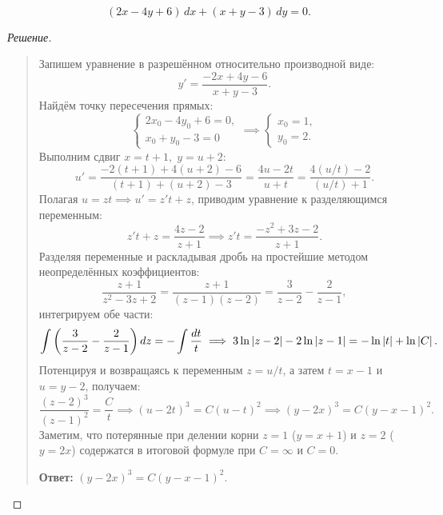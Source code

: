 \begin{example} ~
    \begin{equation} \label{eq:l5_ex2}
        (2x - 4y + 6) \, dx + (x + y - 3) \, dy = 0. \tag{11}
    \end{equation}

    \begin{proof}[Решение]~\\
        \begin{quote}
            Запишем уравнение в разрешённом относительно производной виде:
            \[
                y' = \frac{-2x + 4y - 6}{x + y - 3}.
            \]
            Найдём точку пересечения прямых:
            \[
                \begin{cases}
                    2x_0 - 4y_0 + 6 = 0, \\
                    x_0 + y_0 - 3 = 0
                \end{cases} \implies
                \begin{cases}
                    x_0 = 1, \\
                    y_0 = 2.
                \end{cases}
            \]
            Выполним сдвиг $x = t + 1, \; y = u + 2$:
            \[
                u' = \frac{-2(t + 1) + 4(u + 2) - 6}{(t + 1) + (u + 2) - 3} =
                \frac{4u - 2t}{u + t} = \frac{4(u/t) - 2}{(u/t) + 1}.
            \]
            Полагая $u = z t \implies u' = z' t + z$, приводим уравнение к
            разделяющимся переменным:
            \[
                z' t + z = \frac{4z - 2}{z + 1} \implies
                z' t = \frac{-z^2 + 3z - 2}{z + 1}.
            \]
            Разделяя переменные и раскладывая дробь на простейшие методом
            неопределённых коэффициентов:
            \[
                \frac{z + 1}{z^2 - 3z + 2} = \frac{z + 1}{(z - 1)(z - 2)} =
                \frac{3}{z - 2} - \frac{2}{z - 1},
            \]
            интегрируем обе части:
            \[
                \int \left(\frac{3}{z - 2} - \frac{2}{z - 1}\right) dz =
                -\int \frac{dt}{t} \implies
                3 \ln \left| z - 2 \right| - 2 \ln \left| z - 1 \right| = -\ln \left| t \right| + \ln \left| C \right|.
            \]
            Потенцируя и возвращаясь к переменным $z = u/t$, а затем
            $t = x - 1$ и $u = y - 2$, получаем:
            \[
                \frac{(z - 2)^3}{(z - 1)^2} = \frac{C}{t} \implies
                (u - 2t)^3 = C (u - t)^2 \implies
                (y - 2x)^3 = C (y - x - 1)^2.
            \]
            Заметим, что потерянные при делении корни $z = 1$ ($y = x + 1$) и
            $z = 2$ ($y = 2x$) содержатся в итоговой формуле при $C = \infty$
            и $C = 0$.

            \textbf{Ответ:} $(y - 2x)^3 = C (y - x - 1)^2$.
        \end{quote}
    \end{proof}
\end{example}


